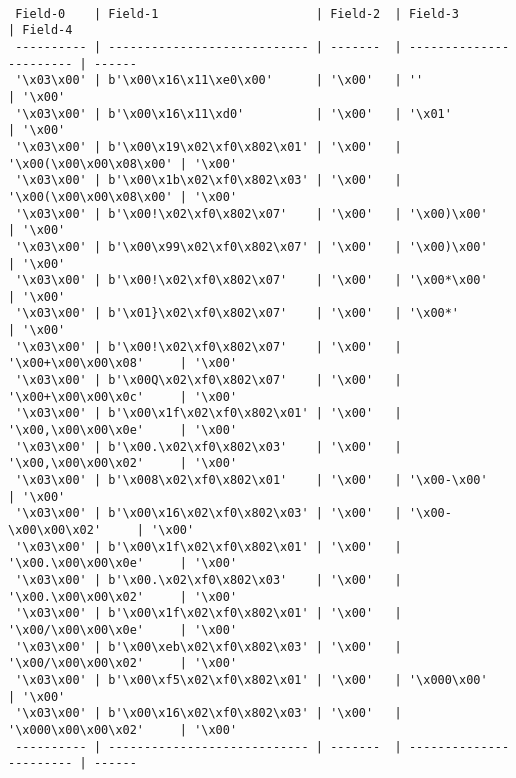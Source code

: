 \begin{verbatim}

 Field-0    | Field-1                      | Field-2  | Field-3                 | Field-4
 ---------- | ---------------------------- | -------  | ----------------------- | ------ 
 '\x03\x00' | b'\x00\x16\x11\xe0\x00'      | '\x00'   | ''                      | '\x00' 
 '\x03\x00' | b'\x00\x16\x11\xd0'          | '\x00'   | '\x01'                  | '\x00' 
 '\x03\x00' | b'\x00\x19\x02\xf0\x802\x01' | '\x00'   | '\x00(\x00\x00\x08\x00' | '\x00' 
 '\x03\x00' | b'\x00\x1b\x02\xf0\x802\x03' | '\x00'   | '\x00(\x00\x00\x08\x00' | '\x00' 
 '\x03\x00' | b'\x00!\x02\xf0\x802\x07'    | '\x00'   | '\x00)\x00'             | '\x00' 
 '\x03\x00' | b'\x00\x99\x02\xf0\x802\x07' | '\x00'   | '\x00)\x00'             | '\x00' 
 '\x03\x00' | b'\x00!\x02\xf0\x802\x07'    | '\x00'   | '\x00*\x00'             | '\x00' 
 '\x03\x00' | b'\x01}\x02\xf0\x802\x07'    | '\x00'   | '\x00*'                 | '\x00' 
 '\x03\x00' | b'\x00!\x02\xf0\x802\x07'    | '\x00'   | '\x00+\x00\x00\x08'     | '\x00' 
 '\x03\x00' | b'\x00Q\x02\xf0\x802\x07'    | '\x00'   | '\x00+\x00\x00\x0c'     | '\x00' 
 '\x03\x00' | b'\x00\x1f\x02\xf0\x802\x01' | '\x00'   | '\x00,\x00\x00\x0e'     | '\x00' 
 '\x03\x00' | b'\x00.\x02\xf0\x802\x03'    | '\x00'   | '\x00,\x00\x00\x02'     | '\x00' 
 '\x03\x00' | b'\x008\x02\xf0\x802\x01'    | '\x00'   | '\x00-\x00'             | '\x00' 
 '\x03\x00' | b'\x00\x16\x02\xf0\x802\x03' | '\x00'   | '\x00-\x00\x00\x02'     | '\x00' 
 '\x03\x00' | b'\x00\x1f\x02\xf0\x802\x01' | '\x00'   | '\x00.\x00\x00\x0e'     | '\x00' 
 '\x03\x00' | b'\x00.\x02\xf0\x802\x03'    | '\x00'   | '\x00.\x00\x00\x02'     | '\x00' 
 '\x03\x00' | b'\x00\x1f\x02\xf0\x802\x01' | '\x00'   | '\x00/\x00\x00\x0e'     | '\x00' 
 '\x03\x00' | b'\x00\xeb\x02\xf0\x802\x03' | '\x00'   | '\x00/\x00\x00\x02'     | '\x00' 
 '\x03\x00' | b'\x00\xf5\x02\xf0\x802\x01' | '\x00'   | '\x000\x00'             | '\x00' 
 '\x03\x00' | b'\x00\x16\x02\xf0\x802\x03' | '\x00'   | '\x000\x00\x00\x02'     | '\x00' 
 ---------- | ---------------------------- | -------  | ----------------------- | ------ 
 
 \end{verbatim}
